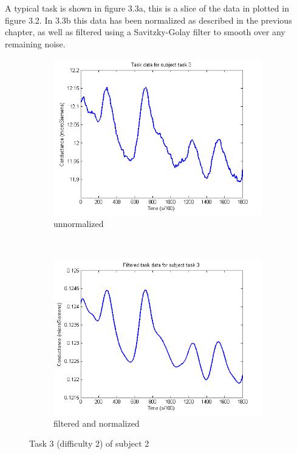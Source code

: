 \documentclass[11pt,leqno,a4paper]{report} %
\begin{document}
A typical task is shown in figure 3.3a, this is a slice of the data in plotted in figure 3.2. In 3.3b this data has been normalized as described in the previous chapter, as well as filtered using a Savitzky-Golay filter to smooth over any remaining noise.


\begin{figure}[h!]
\hspace*{-.2\textwidth}        \centering
        \begin{subfigure}[b]{0.7\textwidth}
                \includegraphics[width=\textwidth]{measurements/singletaskunnormal.png}
                \caption{unnormalized}
                \label{fig:singleunnormal}
        \end{subfigure}%
        ~ %
        \begin{subfigure}[b]{0.7\textwidth}
                \includegraphics[width=\textwidth]{measurements/singletaskfilt.png}
                \caption{filtered and normalized}
                \label{fig:singlefiltered}
        \end{subfigure}
        \caption{Task 3 (difficulty 2) of subject 2}\label{fig:animals}
\end{figure}
\end{document}
